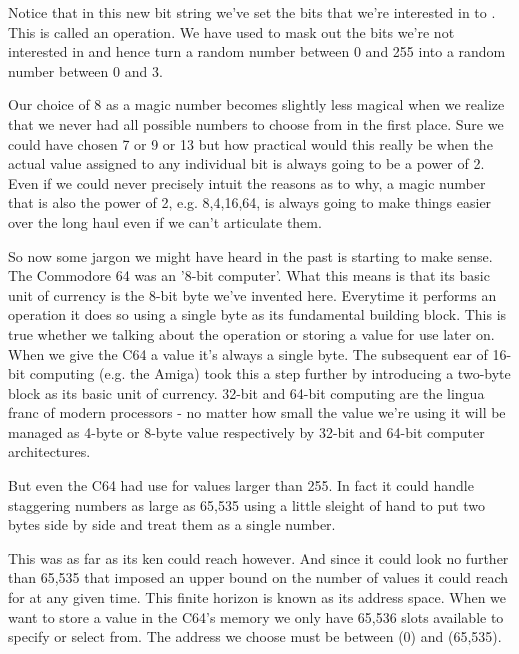 Notice that in this new bit string we've set the bits that we're interested in
to .  This is called an  operation. We have used
 to mask out the bits we're not interested in and hence turn a
random number between 0 and 255 into a random number between 0 and 3.

Our choice of 8 as a magic number becomes slightly less magical when we realize
that we never had all possible numbers to choose from in the first place. Sure
we could have chosen 7 or 9 or 13 but how practical would this really be when
the actual value assigned to any individual bit is always going to be a power of
2. Even if we could never precisely intuit the reasons as to why, a magic number
that is also the power of 2, e.g. 8,4,16,64, is always going to make things easier
over the long haul even if we can't articulate them.

So now some jargon we might have heard in the past is starting to make sense. The
Commodore 64 was an '8-bit computer'. What this means is that its basic unit of
currency is the 8-bit byte we've invented here. Everytime it performs an operation
it does so using a single byte as its fundamental building block. This is true 
whether we talking about the  operation or storing a value for use
later on. When we give the C64 a value it's always a single byte. The subsequent
ear of 16-bit computing (e.g. the Amiga) took this a step further by introducing
a two-byte block as its basic unit of currency. 32-bit and 64-bit computing are the
lingua franc of modern processors - no matter how small the value we're using it
will be managed as 4-byte or 8-byte value respectively by 32-bit and 64-bit
computer architectures.

But even the C64 had use for values larger than 255. In fact it could handle staggering
numbers as large as 65,535 using a little sleight of hand to put two bytes side by side
and treat them as a single number.

This was as far as its ken could reach however. And since it could look no further than
65,535 that imposed an upper bound on the number of values it could reach for at any given
time. This finite horizon is known as its address space. When we want to store a value
in the C64's memory we only have 65,536 slots available to specify or select from. The
address we choose must be between  (0) and  (65,535).

